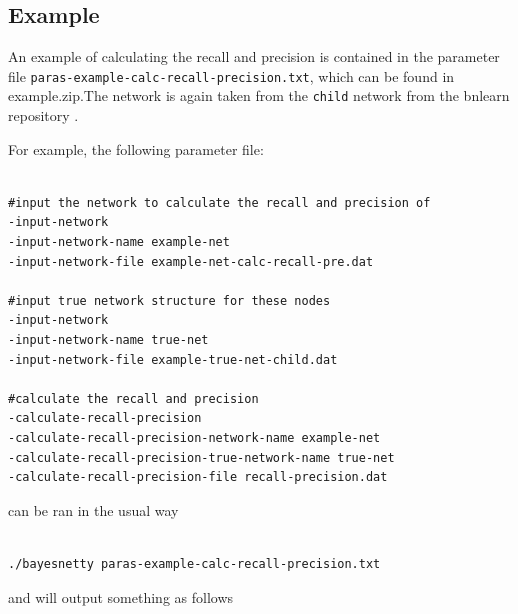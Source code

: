 \documentclass[a4paper,12pt]{article}
\newcommand{\code}[1]{{\footnotesize{{\tt #1}}}}
\begin{document}

\subsection{Example}
\label{calc-recall-precision-example}

An example of calculating the recall and precision is contained in the parameter file \code{paras-example-calc-recall-precision.txt}, which can be found in example.zip.The network is again taken from the \code{child} network from the bnlearn repository \citet{bnlearn}. 

For example, the following parameter file: 
\vspace{0.35cm} \begin{lstlisting}

#input the network to calculate the recall and precision of
-input-network
-input-network-name example-net
-input-network-file example-net-calc-recall-pre.dat

#input true network structure for these nodes
-input-network
-input-network-name true-net
-input-network-file example-true-net-child.dat

#calculate the recall and precision
-calculate-recall-precision
-calculate-recall-precision-network-name example-net
-calculate-recall-precision-true-network-name true-net
-calculate-recall-precision-file recall-precision.dat

\end{lstlisting} \vspace{0.35cm}
can be ran in the usual way 
\vspace{0.35cm} \begin{lstlisting}

./bayesnetty paras-example-calc-recall-precision.txt

\end{lstlisting} \vspace{0.35cm}
and will output something as follows 
\end{document}
